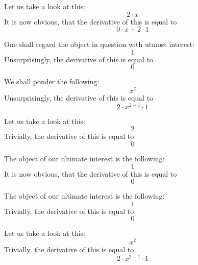 \documentclass{article}
\begin{document}
Let us take a look at this:
\begin{equation}
2 \cdot x 
\end{equation}
It is now obvious, that the derivative of this is equal to
\begin{equation}
0 \cdot x + 2 \cdot 1 
\end{equation}

One shall regard the object in question with utmost interest:
\begin{equation}
1 
\end{equation}
Unsurprisingly, the derivative of this is equal to
\begin{equation}
0 
\end{equation}

We shall ponder the following:
\begin{equation}
x ^{2 } 
\end{equation}
Unsurprisingly, the derivative of this is equal to
\begin{equation}
2 \cdot x ^{2 - 1 } \cdot 1 
\end{equation}

Let us take a look at this:
\begin{equation}
2 
\end{equation}
Trivially, the derivative of this is equal to
\begin{equation}
0 
\end{equation}

The object of our ultimate interest is the following:
\begin{equation}
1 
\end{equation}
It is now obvious, that the derivative of this is equal to
\begin{equation}
0 
\end{equation}

The object of our ultimate interest is the following:
\begin{equation}
1 
\end{equation}
Trivially, the derivative of this is equal to
\begin{equation}
0 
\end{equation}

Let us take a look at this:
\begin{equation}
x ^{2 } 
\end{equation}
Trivially, the derivative of this is equal to
\begin{equation}
2 \cdot x ^{2 - 1 } \cdot 1 
\end{equation}
\end{document}
